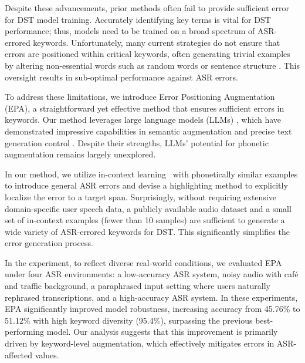 Despite these advancements, prior methods often fail to provide sufficient error for DST model training. Accurately identifying key terms is vital for DST performance; thus, models need to be trained on a broad spectrum of ASR-errored keywords. Unfortunately, many current strategies do not ensure that errors are positioned within critical keywords, often generating trivial examples by altering non-essential words such as random words \cite{eda} or sentence structure \cite{BT}. This oversight results in sub-optimal performance against ASR errors.

To address these limitations, we introduce Error Positioning Augmentation (EPA), a straightforward yet effective method that ensures sufficient errors in keywords. Our method leverages large language models (LLMs) \cite{openai, touvron2023llama, zhang2022opt}, which have demonstrated impressive capabilities in semantic augmentation \cite{semaug1, semaug2} and precise text generation control \cite{control1, control2}. Despite their strengths, LLMs' potential for phonetic augmentation remains largely unexplored.

In our method, we utilize in-context learning~\cite{incontext} with phonetically similar examples to introduce general ASR errors and devise a highlighting method to explicitly localize the error to a target span. Surprisingly, without requiring extensive domain-specific user speech data, a publicly available audio dataset and a small set of in-context examples (fewer than 10 samples) are sufficient to generate a wide variety of ASR-errored keywords for DST. This significantly simplifies the error generation process.


In the experiment, to reflect diverse real-world conditions, we evaluated EPA under four ASR environments: a low-accuracy ASR system, noisy audio with café and traffic background, a paraphrased input setting where users naturally rephrased transcriptions, and a high-accuracy ASR system. In these experiments,  EPA significantly improved model robustness, increasing accuracy from 45.76\% to 51.12\% with high keyword diversity (95.4\%), surpassing the previous best-performing model. Our analysis suggests that this improvement is primarily driven by keyword-level augmentation, which effectively mitigates errors in ASR-affected values.

